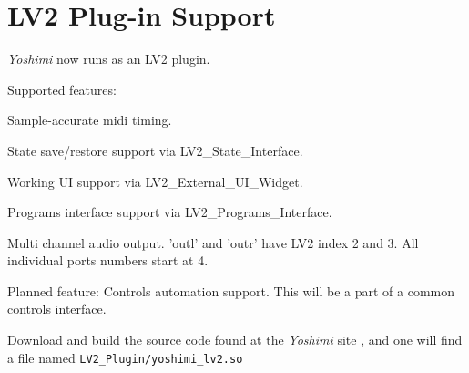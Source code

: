 %
%
%

\section{LV2 Plug-in Support}
\label{sec:lv2_plugin}

   \textsl{Yoshimi} now runs as an LV2 plugin.

Supported features:

   \begin{enumber}
      \item Sample-accurate midi timing.
      \item State save/restore support via LV2\_State\_Interface.
      \item Working UI support via LV2\_External\_UI\_Widget.
      \item Programs interface support via LV2\_Programs\_Interface.
      \item Multi channel audio output. 'outl' and 'outr' have LV2 index 2
         and 3. All individual ports numbers start at 4.
   \end{enumber}

   Planned feature: Controls automation support. This will be a part of a
   common controls interface.

   Download and build the source code found at the
   \textsl{Yoshimi} site \cite{yoshimi},
   and one will find a file named
   \texttt{LV2\_Plugin/yoshimi\_lv2.so}

%


